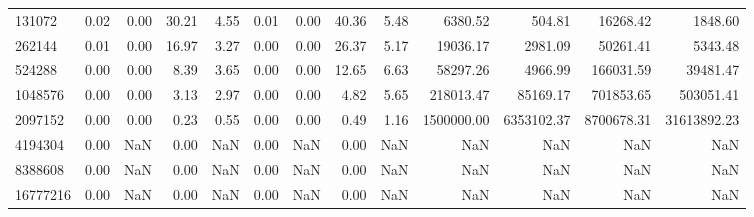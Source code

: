 \begin{tabular}{lrrrrrrrrrrrr}
131072 & 0.02 & 0.00 & 30.21 & 4.55 & 0.01 & 0.00 & 40.36 & 5.48 & 6380.52 & 504.81 & 16268.42 & 1848.60 \\
262144 & 0.01 & 0.00 & 16.97 & 3.27 & 0.00 & 0.00 & 26.37 & 5.17 & 19036.17 & 2981.09 & 50261.41 & 5343.48 \\
524288 & 0.00 & 0.00 & 8.39 & 3.65 & 0.00 & 0.00 & 12.65 & 6.63 & 58297.26 & 4966.99 & 166031.59 & 39481.47 \\
1048576 & 0.00 & 0.00 & 3.13 & 2.97 & 0.00 & 0.00 & 4.82 & 5.65 & 218013.47 & 85169.17 & 701853.65 & 503051.41 \\
2097152 & 0.00 & 0.00 & 0.23 & 0.55 & 0.00 & 0.00 & 0.49 & 1.16 & 1500000.00 & 6353102.37 & 8700678.31 & 31613892.23 \\
4194304 & 0.00 & NaN & 0.00 & NaN & 0.00 & NaN & 0.00 & NaN & NaN & NaN & NaN & NaN \\
8388608 & 0.00 & NaN & 0.00 & NaN & 0.00 & NaN & 0.00 & NaN & NaN & NaN & NaN & NaN \\
16777216 & 0.00 & NaN & 0.00 & NaN & 0.00 & NaN & 0.00 & NaN & NaN & NaN & NaN & NaN \\
\bottomrule
\end{tabular}
